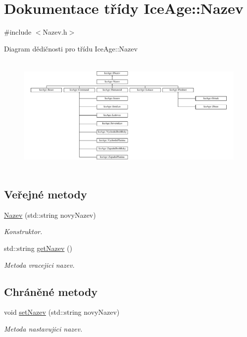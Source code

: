 \hypertarget{classIceAge_1_1Nazev}{}\section{Dokumentace třídy Ice\+Age\+:\+:Nazev}
\label{classIceAge_1_1Nazev}


{\ttfamily \#include $<$Nazev.\+h$>$}

Diagram dědičnosti pro třídu Ice\+Age\+:\+:Nazev\begin{figure}[H]
\begin{center}
\leavevmode
\includegraphics[height=5.866667cm]{d4/d9d/classIceAge_1_1Nazev}
\end{center}
\end{figure}
\subsection*{Veřejné metody}
\begin{DoxyCompactItemize}
\item 
\hyperlink{classIceAge_1_1Nazev_a633e5ae710d8d9e8fcf043bcf9e3d6d0}{Nazev} (std\+::string novy\+Nazev)
\begin{DoxyCompactList}\small\item\em Konstruktor. \end{DoxyCompactList}\item 
std\+::string \hyperlink{classIceAge_1_1Nazev_a09fcdd11a072b4a133cab63cdb4961a0}{get\+Nazev} ()
\begin{DoxyCompactList}\small\item\em Metoda vracejici nazev. \end{DoxyCompactList}\end{DoxyCompactItemize}
\subsection*{Chráněné metody}
\begin{DoxyCompactItemize}
\item 
void \hyperlink{classIceAge_1_1Nazev_ad5ad071231518f88e0699ac668d73b99}{set\+Nazev} (std\+::string novy\+Nazev)
\begin{DoxyCompactList}\small\item\em Metoda nastavujici nazev. \end{DoxyCompactList}\end{DoxyCompactItemize}
